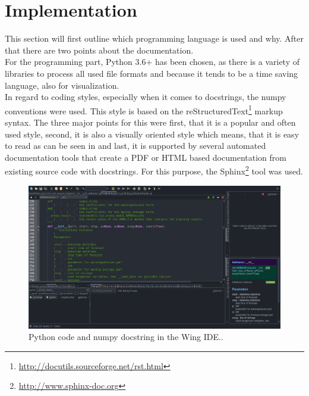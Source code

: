 \section{Implementation}
\label{sec:prog}

This section will first outline which programming language is used and why. After that there are two points about the documentation.\\

For the programming part, Python 3.6+ has been chosen, as there is a variety of libraries to process all used file formats and because it tends to be a time saving language, also for visualization.\\

In regard to coding styles, especially when it comes to docstrings, the numpy conventions were used. This style is based on the reStructuredText\footnote{\url{http://docutils.sourceforge.net/rst.html}} markup syntax. The three major points for this were first, that it is a popular and often used style, second, it is also a visually oriented style which means, that it is easy to read as can be seen in  and last, it is supported by several automated documentation tools that create a PDF or HTML based documentation from existing source code with docstrings. For this purpose, the Sphinx\footnote{\url{http://www.sphinx-doc.org}} tool was used.\\

\begin{figure}[h!]%
\centering
\includegraphics[width=\textwidth]{logos/Predictions_Wing_001}%
\caption[Python code and numpy docstring in the Wing IDE.]{Python code and numpy docstring in the Wing IDE.\footnotemark.}%
\label{fig:wing_docstrings}%
\end{figure}


